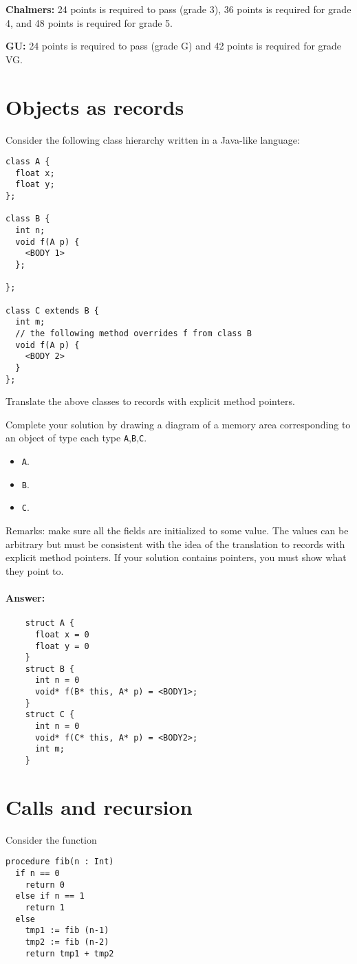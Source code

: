 \documentclass{article}
\newcommand{\answer}{\paragraph{Answer:}}
\begin{document}
\textbf{Chalmers:}
24 points is required to pass (grade 3), 36 points is required for
grade 4, and 48 points is required for grade 5.

\textbf{GU:}
24 points is required to pass (grade G) and 42 points is
required for grade VG.

\section{Objects as records}

Consider the following class hierarchy written in a Java-like
language:
\begin{verbatim}
class A {
  float x;
  float y;
};

class B {
  int n;
  void f(A p) {
    <BODY 1>
  };

};

class C extends B {
  int m;
  // the following method overrides f from class B
  void f(A p) { 
    <BODY 2>
  }
};
\end{verbatim}

Translate the above classes to records with explicit method pointers.

Complete your solution by drawing a diagram of a memory area
corresponding to an object of type each type \texttt A,\texttt B,\texttt C.
\begin{itemize}
\item \texttt A. 
\item \texttt B. 
\item \texttt C. 
\end{itemize}
Remarks: make sure all the fields are initialized to some value. The
values can be arbitrary but must be consistent with the idea of the
translation to records with explicit method pointers. If your solution
contains pointers, you must show what they point to.

\answer{
\begin{verbatim}
    struct A {
      float x = 0
      float y = 0
    }
    struct B {
      int n = 0
      void* f(B* this, A* p) = <BODY1>;
    }
    struct C {
      int n = 0
      void* f(C* this, A* p) = <BODY2>;
      int m;
    }
\end{verbatim}}


\newpage
\section{Calls and recursion}
Consider the function
\begin{verbatim}
procedure fib(n : Int)
  if n == 0
    return 0
  else if n == 1
    return 1
  else 
    tmp1 := fib (n-1)
    tmp2 := fib (n-2)
    return tmp1 + tmp2
\end{verbatim}
\end{document}
